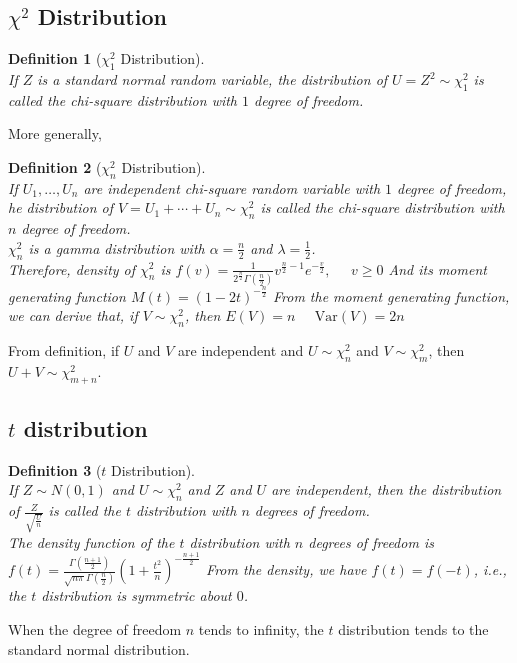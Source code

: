\documentclass[12pt]{article}
\newcommand{\var}{\mathrm{Var}}
\newtheorem{definition}{Definition}[section]
\theoremstyle{definition}
\begin{document}
\subsection{{$\chi^2$} Distribution}
\begin{definition}[{$\chi^2_1$} Distribution]
\hfill\\\normalfont If $Z$ is a standard normal random variable, the distribution of $U=Z^2\sim \chi^2_1$ is called the chi-square distribution with $1$ degree of freedom.
\end{definition}
More generally,
\begin{definition}[{$\chi^2_n$} Distribution]
\hfill\\\normalfont If $U_1,\ldots, U_n$ are independent chi-square random variable with $1$ degree of freedom, he distribution of $V=U_1+\cdots+U_n \sim \chi_n^2$ is called the chi-square distribution with $n$ degree of freedom.\\
$\chi_n^2$ is a gamma distribution with $\alpha=\frac{n}{2}$ and $\lambda=\frac{1}{2}$.\\
Therefore, density of $\chi_n^2$ is
$
f(v) = \frac{1}{2^{\frac{n}{2}}\Gamma(\frac{n}{2})}v^{\frac{n}{2}-1}e^{-\frac{v}{2}},\;\;\;\;\;v\geq 0
$
And its moment generating function 
$
M(t) = (1-2t)^{-\frac{n}{2}}
$
From the moment generating function, we can derive that, if $V\sim \chi_n^2$, then
$
E(V)=n\;\;\;\;\; \var(V) = 2n
$
\end{definition}
From definition, if $U$ and $V$ are independent and $U\sim \chi_n^2$ and $V\sim\chi_m^2$, then $U+V\sim\chi_{m+n}^2$.
\subsection{{$t$} distribution}
\begin{definition}[{$t$} Distribution]
\hfill\\\normalfont If $Z\sim N(0,1)$ and $U\sim \chi_n^2$ and $Z$ and $U$ are independent, then the distribution of $\frac{Z}{\sqrt{\frac{U}{n}}}$ is called the $t$ distribution with $n$ degrees of freedom.\\
The density function of the $t$ distribution with $n$ degrees of freedom is
$
f(t) = \frac{\Gamma(\frac{n+1}{2})}{\sqrt{n\pi}\Gamma(\frac{n}{2})}(1+\frac{t^2}{n})^{-\frac{n+1}{2}}
$
From the density, we have $f(t) = f(-t)$, i.e., the $t$ distribution is symmetric about $0$.
\end{definition}
When the degree of freedom $n$ tends to infinity, the $t$ distribution tends to the standard normal distribution.
\end{document}
